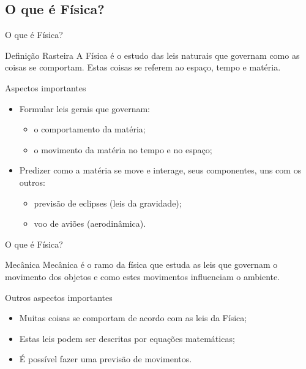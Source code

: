 \documentclass[xcolor=dvipsnames,table]{beamer}
\begin{document}
	\subsection{O que é Física?}
	\begin{frame}{O que é Física?}
		\begin{block}{Definição Rasteira}
			A Física é o estudo das leis naturais que governam como as coisas se comportam. Estas coisas se referem ao espaço, tempo e matéria.
		\end{block} \pause
		\begin{block}{Aspectos importantes}
			\begin{itemize}
				\item Formular leis gerais que governam: \pause
					\begin{itemize} 
						\item o comportamento da matéria;
						\item o movimento da matéria no tempo e no espaço;
					\end{itemize} \pause
				\item Predizer como a matéria se move e interage, seus componentes, uns com os outros: \pause
					\begin{itemize}
						\item previsão de eclipses (leis da gravidade);
						\item voo de aviões (aerodinâmica).
					\end{itemize}
			\end{itemize}
		\end{block}	
	\end{frame}
	
	\begin{frame}{O que é Física?}
		\begin{block}{Mecânica}
			 Mecânica é o ramo da física que estuda as leis que governam o movimento dos objetos e como estes movimentos influenciam o ambiente.
		\end{block} \pause
		\begin{block}{Outros aspectos importantes}
			\begin{itemize}
				\item Muitas coisas se comportam de acordo com as leis da Física; \pause
				\item Estas leis podem ser descritas por equações matemáticas; \pause
				\item É possível fazer uma previsão de movimentos.
			\end{itemize}
		\end{block}	
	\end{frame}
	
\end{document}
